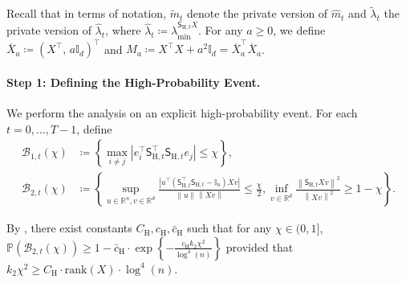 \documentclass[11pt]{article}
\theoremstyle{definition}
\theoremstyle{plain}
\newcommand{\reals}{\mathbb{R}}
\providecommand{\brI}{\mathbb{I}}
\newcommand{\abs}[1]{\left| #1 \right|}
\newcommand{\Norm}[1]{\left\| #1 \right\|}
\providecommand{\norm}[1]{\Norm{#1}}
\begin{document}
Recall that in terms of notation, $\widetilde{m}_t$ denote the private version of $\widehat{m}_t$ and $\widetilde{\lambda}_t$ the private version of $\widehat{\lambda}_t$, where $\widehat{\lambda}_t \coloneq \lambda^{\mathsf{S}_{\mathrm{H},t} X}_{\min}.$ For any $a \geq 0$, we define $\overline{X}_a \coloneq (X^\top,\, a\brI_d)^\top$ and $M_a \coloneq X^\top X + a^2 \brI_d = \overline{X}_a^\top \overline{X}_a$. 

\paragraph{Step 1: Defining the High-Probability Event. }\mbox{}

We perform the analysis on an explicit high-probability event. For each
$t=0,\ldots,T-1$, define
\begin{align}
    \mathcal{B}_{1,t}(\chi) &\coloneq \left\{
        \max_{i \ne j}\abs{e_i^\top \mathsf{S}_{\mathrm{H},t}^\top \mathsf{S}_{\mathrm{H},t} e_j} \leq \chi\right\}, \\
    \mathcal{B}_{2,t}(\chi) &\coloneq \left\{\sup_{u \in \reals^n, v \in \reals^d}
        \frac{\left|u^\top\left(\mathsf{S}_{\mathrm{H},t}^\top \mathsf{S}_{\mathrm{H},t} - \brI_n\right)Xv\right|}
        {\norm{u}\norm{Xv}}
        \leq \frac{\chi}{2}, \inf_{v \in \reals^d}
        \frac{\norm{\mathsf{S}_{\mathrm{H},t} Xv}^2}{\norm{Xv}^2}
        \geq 1 - \chi\right\}.
\end{align}

By \citet[Lemma.~1]{pilanci_hessiansketch},
there exist constants $C_{\mathrm{H}}, c_{\mathrm{H}}, \bar{c}_{\mathrm{H}}$ such that for any $\chi \in (0, 1]$,
$\mathbb{P}\left(\mathcal{B}_{2,t}(\chi)\right) \geq 1-\bar{c}_{\mathrm{H}}\cdot \exp\left\{-\frac{c_{\mathrm{H}} k_2 \chi^2}{\log^4(n)}
\right\}$ provided that $k_2 \chi^2 \ge C_{\mathrm{H}} \cdot \mathrm{rank}(X)\cdot \log^4(n).$
\end{document}
